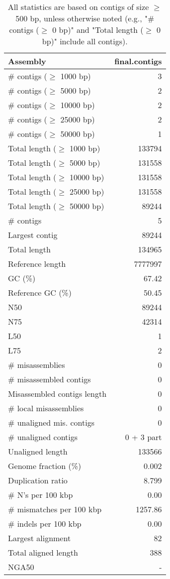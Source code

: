 \documentclass[12pt,a4paper]{article}
\begin{document}
\begin{table}[ht]
\begin{center}
\caption{All statistics are based on contigs of size $\geq$ 500 bp, unless otherwise noted (e.g., "\# contigs ($\geq$ 0 bp)" and "Total length ($\geq$ 0 bp)" include all contigs).}
\begin{tabular}{|l*{1}{|r}|}
\hline
Assembly & final.contigs \\ \hline
\# contigs ($\geq$ 1000 bp) & 3 \\ \hline
\# contigs ($\geq$ 5000 bp) & 2 \\ \hline
\# contigs ($\geq$ 10000 bp) & 2 \\ \hline
\# contigs ($\geq$ 25000 bp) & 2 \\ \hline
\# contigs ($\geq$ 50000 bp) & 1 \\ \hline
Total length ($\geq$ 1000 bp) & 133794 \\ \hline
Total length ($\geq$ 5000 bp) & 131558 \\ \hline
Total length ($\geq$ 10000 bp) & 131558 \\ \hline
Total length ($\geq$ 25000 bp) & 131558 \\ \hline
Total length ($\geq$ 50000 bp) & 89244 \\ \hline
\# contigs & 5 \\ \hline
Largest contig & 89244 \\ \hline
Total length & 134965 \\ \hline
Reference length & 7777997 \\ \hline
GC (\%) & 67.42 \\ \hline
Reference GC (\%) & 50.45 \\ \hline
N50 & 89244 \\ \hline
N75 & 42314 \\ \hline
L50 & 1 \\ \hline
L75 & 2 \\ \hline
\# misassemblies & 0 \\ \hline
\# misassembled contigs & 0 \\ \hline
Misassembled contigs length & 0 \\ \hline
\# local misassemblies & 0 \\ \hline
\# unaligned mis. contigs & 0 \\ \hline
\# unaligned contigs & 0 + 3 part \\ \hline
Unaligned length & 133566 \\ \hline
Genome fraction (\%) & 0.002 \\ \hline
Duplication ratio & 8.799 \\ \hline
\# N's per 100 kbp & 0.00 \\ \hline
\# mismatches per 100 kbp & 1257.86 \\ \hline
\# indels per 100 kbp & 0.00 \\ \hline
Largest alignment & 82 \\ \hline
Total aligned length & 388 \\ \hline
NGA50 & - \\ \hline
\end{tabular}
\end{center}
\end{table}
\end{document}
